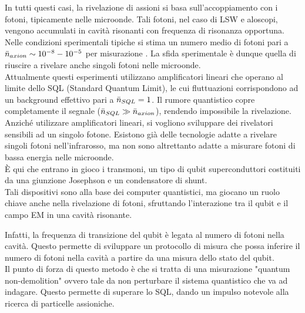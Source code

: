 In tutti questi casi, la rivelazione di assioni si basa sull’accoppiamento con i fotoni, tipicamente nelle microonde.  %
Tali fotoni, nel caso di  LSW e aloscopi, vengono accumulati in cavità risonanti con frequenza di risonanza opportuna. Nelle condizioni sperimentali tipiche si stima un numero medio di fotoni pari a $\Bar{n}_{axion} \sim 10^{-8}-10^{-5}$ per misurazione \cite{PhysRevLett.126.141302}. La sfida sperimentale è dunque quella di riuscire a rivelare anche singoli fotoni nelle microonde.\\ Attualmente questi esperimenti utilizzano amplificatori lineari che operano al limite dello SQL (Standard Quantum Limit), le cui fluttuazioni corrispondono ad un background effettivo pari a $\Bar{n}_{SQL}=1$. 
Il rumore quantistico copre completamente il segnale ($\Bar{n}_{SQL}\gg\Bar{n}_{axion} $), rendendo impossibile la rivelazione.\\

Anziché utilizzare amplificatori lineari, si vogliono sviluppare dei rivelatori sensibili ad un singolo fotone. Esistono già delle tecnologie adatte a rivelare singoli fotoni nell’infrarosso, ma non sono altrettanto adatte a misurare fotoni di bassa energia nelle microonde.\\%

È qui che entrano in gioco i transmoni, un tipo di qubit superconduttori costituiti da una giunzione Josephson e un condensatore di shunt.\\
Tali dispositivi sono alla base dei computer quantistici, ma giocano un ruolo chiave anche nella rivelazione di fotoni, sfruttando l’interazione
tra il qubit e il campo EM in una cavità risonante.

Infatti, la frequenza di transizione del qubit è legata al numero di fotoni nella cavità. Questo permette di sviluppare un protocollo di misura che possa inferire il numero di fotoni nella cavità a partire da una misura dello stato del qubit.\\

Il punto di forza di questo metodo è che si tratta di una misurazione "quantum non-demolition" ovvero tale da non perturbare il sistema quantistico che va ad indagare. Questo permette di superare lo SQL, dando un impulso notevole alla ricerca di particelle assioniche.%




